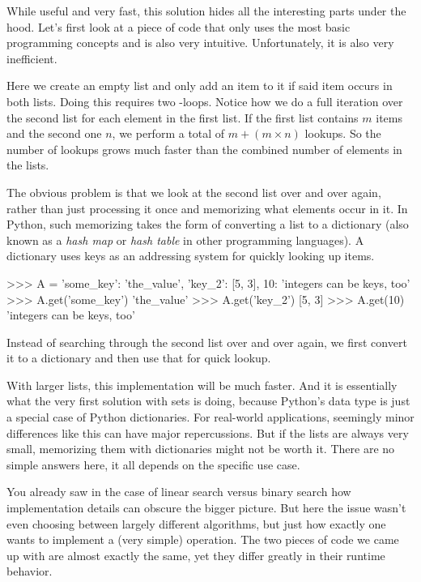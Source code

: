 \begin{programming}
While useful and very fast, this solution hides all the interesting parts under the hood.
Let's first look at a piece of code that only uses the most basic programming concepts and is also very intuitive.
Unfortunately, it is also very inefficient.

\begin{center}
\end{center}

Here we create an empty list and only add an item to it if said item occurs in both lists.
Doing this requires two -loops.
Notice how we do a full iteration over the second list for each element in the first list.
If the first list contains $m$ items and the second one $n$, we perform a total of $m + (m \times n)$ lookups.
So the number of lookups grows much faster than the combined number of elements in the lists.

The obvious problem is that we look at the second list over and over again, rather than just processing it once and memorizing what elements occur in it.
In Python, such memorizing takes the form of converting a list to a dictionary (also known as a \emph{hash map} or \emph{hash table} in other programming languages).
A dictionary uses keys as an addressing system for quickly looking up items.
%
\begin{center}
    \begin{pythoncode}
    >>> A = {'some_key': 'the_value',
             'key_2': [5, 3],
             10: 'integers can be keys, too'}
    >>> A.get('some_key')
    'the_value'
    >>> A.get('key_2')
    [5, 3]
    >>> A.get(10)
    'integers can be keys, too'
    \end{pythoncode}
\end{center}
%
Instead of searching through the second list over and over again, we first convert it to a dictionary and then use that for quick lookup.

\begin{center}
\end{center}

With larger lists, this implementation will be much faster.
And it is essentially what the very first solution with sets is doing, because Python's  data type is just a special case of Python dictionaries.
For real-world applications, seemingly minor differences like this can have major repercussions.
But if the lists are always very small, memorizing them with dictionaries might not be worth it.
There are no simple answers here, it all depends on the specific use case.

You already saw in the case of linear search versus binary search how implementation details can obscure the bigger picture.
But here the issue wasn't even choosing between largely different algorithms, but just how exactly one wants to implement a (very simple) operation.
The two pieces of code we came up with are almost exactly the same, yet they differ greatly in their runtime behavior.
\end{programming}

